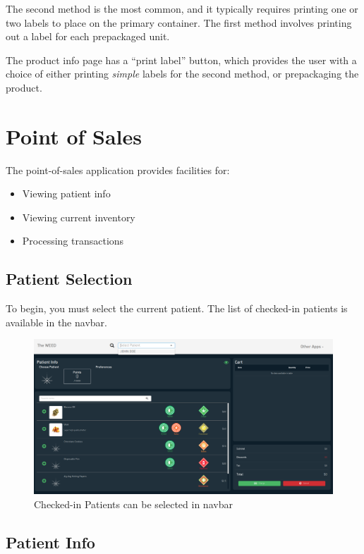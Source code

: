\documentclass[]{book}
\theoremstyle{definition}
\theoremstyle{definition}
\theoremstyle{definition}
\theoremstyle{remark}
\begin{document}
The second method is the most common, and it typically requires printing
one or two labels to place on the primary container. The first method
involves printing out a label for each prepackaged unit.

The product info page has a ``print label'' button, which provides the
user with a choice of either printing \emph{simple} labels for the
second method, or prepackaging the product.

\chapter{Point of Sales}\label{point-of-sales}

The point-of-sales application provides facilities for:

\begin{itemize}
\item
  Viewing patient info
\item
  Viewing current inventory
\item
  Processing transactions
\end{itemize}

\section{Patient Selection}\label{patient-selection}

To begin, you must select the current patient. The list of checked-in
patients is available in the navbar.

\begin{figure}
\centering
\includegraphics{images/P1.png}
\caption{Checked-in Patients can be selected in navbar}
\end{figure}

\section{Patient Info}\label{patient-info}
\end{document}

